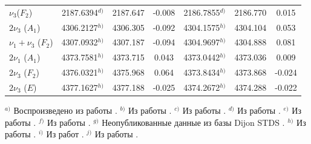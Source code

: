 \begin{longtable}{lccc ccc}
$\nu_3$($F_2$) & 2187.6394$^{d)}$ & 2187.647 & -0.008 & 2186.7855$^{d)}$ & 2186.770 & 0.015 \\
$2\nu_3$ ($A_1$) & 4306.2127$^{h)}$ & 4306.305 & -0.092 & 4304.1575$^{h)}$ & 4304.104 & 0.053 \\
$\nu_1+\nu_3$ ($F_2$) & 4307.0932$^{h)}$ & 4307.187 & -0.094 & 4304.9697$^{h)}$ & 4304.888 & 0.081 \\
$2\nu_1$ ($A_1$) & 4373.7581$^{h)}$ & 4373.715 & 0.043 & 4373.0442$^{h)}$ & 4373.036 & 0.009 \\
$2\nu_3$ ($F_2$) & 4376.0321$^{h)}$ & 4375.968 & 0.064 & 4373.8434$^{h)}$ & 4373.868 & -0.024 \\
$2\nu_3$ ($E  $) & 4377.1627$^{h)}$ & 4377.188 & -0.025 & 4374.2672$^{h)}$ & 4374.288 & -0.022 \\
\end{longtable}

\vspace{0.5ex}
\begin{minipage}{0.95\textwidth}
\scriptsize
$^{a)}$ Воспроизведено из работы \cite{wang}.\quad
$^{b)}$ Из работы \cite{4302}.\quad
$^{c)}$ Из работы \cite{4303}.\quad
$^{d)}$ Из работы \cite{4301}.\quad
$^{e)}$ Из работы \cite{5312}.\quad
$^{f)}$ Из работы \cite{4312}.\quad
$^{g)}$ Неопубликованные данные из базы Dijon STDS \cite{dijon}.\quad
$^{h)}$ Из работы \cite{4300}.\quad
$^{i)}$ Из работ \cite{zhu2,zhu3}.\quad
$^{j)}$ Из работы \cite{chegl}. 
\end{minipage}

\endgroup
